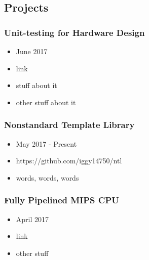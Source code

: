 \documentclass[18pt]{article}
\providecommand{\tightlist}{
    \setlength{\itemsep}{0pt}\setlength{\parskip}{0pt}
}
\begin{document}
  \begin{multicols}{2}

  \subsection*{Projects}\label{projects}
        
      \subsubsection*{Unit-testing for Hardware Design}
      \begin{itemize}\tightlist
        \item June 2017
        \item link
        \item stuff about it
        \item other stuff about it
      \end{itemize}
        
      \subsubsection*{Nonstandard Template Library}
      \begin{itemize}\tightlist
        \item May 2017 - Present
        \item https://github.com/iggy14750/ntl
        \item words, words, words
      \end{itemize}
          
      \subsubsection*{Fully Pipelined MIPS CPU}
      \begin{itemize}\tightlist
        \item April 2017
        \item link
        \item other stuff
      \end{itemize}
      
      

\end{multicols}
\end{document}
